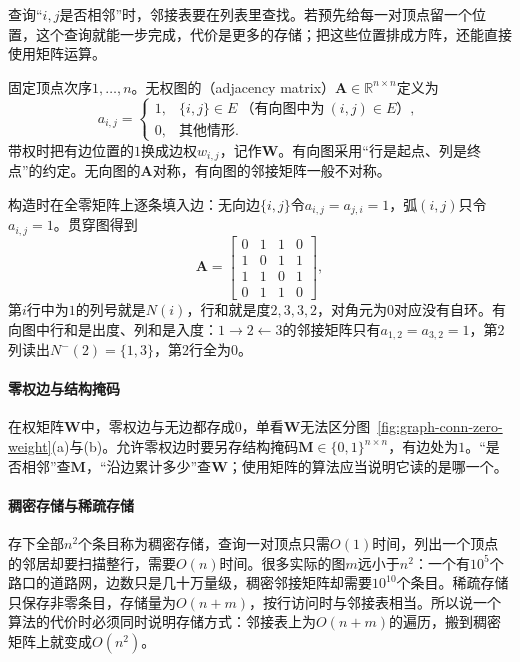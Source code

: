 查询“$i,j$是否相邻”时，邻接表要在列表里查找。若预先给每一对顶点留一个位置，这个查询就能一步完成，代价是更多的存储；把这些位置排成方阵，还能直接使用矩阵运算。

固定顶点次序$1,\ldots,n$。无权图的（adjacency matrix）$\bm A\in\mathbb R^{n\times n}$定义为
\[
a_{i,j}=
\begin{cases}
1, & \{i,j\}\in E\ \text{（有向图中为}\ (i,j)\in E\text{）},\\
0, & \text{其他情形}.
\end{cases}
\]
带权时把有边位置的$1$换成边权$w_{i,j}$，记作$\bm W$。有向图采用“行是起点、列是终点”的约定。无向图的$\bm A$对称，有向图的邻接矩阵一般不对称。

构造时在全零矩阵上逐条填入边：无向边$\{i,j\}$令$a_{i,j}=a_{j,i}=1$，弧$(i,j)$只令$a_{i,j}=1$。贯穿图得到
\begin{equation}
\bm A=
\begin{bmatrix}
0&1&1&0\\
1&0&1&1\\
1&1&0&1\\
0&1&1&0
\end{bmatrix},
\label{eq:graph-conn-running-adjacency}
\end{equation}
第$i$行中为$1$的列号就是$N(i)$，行和就是度$2,3,3,2$，对角元为$0$对应没有自环。有向图中行和是出度、列和是入度：$1\to2\leftarrow3$的邻接矩阵只有$a_{1,2}=a_{3,2}=1$，第$2$列读出$N^-(2)=\{1,3\}$，第$2$行全为$0$。

\paragraph{零权边与结构掩码}
在权矩阵$\bm W$中，零权边与无边都存成$0$，单看$\bm W$无法区分图~\ref{fig:graph-conn-zero-weight}(a)与(b)。允许零权边时要另存结构掩码$\bm M\in\{0,1\}^{n\times n}$，有边处为$1$。“是否相邻”查$\bm M$，“沿边累计多少”查$\bm W$；使用矩阵的算法应当说明它读的是哪一个。

\paragraph{稠密存储与稀疏存储}
存下全部$n^2$个条目称为稠密存储，查询一对顶点只需$O(1)$时间，列出一个顶点的邻居却要扫描整行，需要$O(n)$时间。很多实际的图$m$远小于$n^2$：一个有$10^5$个路口的道路网，边数只是几十万量级，稠密邻接矩阵却需要$10^{10}$个条目。稀疏存储只保存非零条目，存储量为$O(n+m)$，按行访问时与邻接表相当。所以说一个算法的代价时必须同时说明存储方式：邻接表上为$O(n+m)$的遍历，搬到稠密矩阵上就变成$O(n^2)$。

